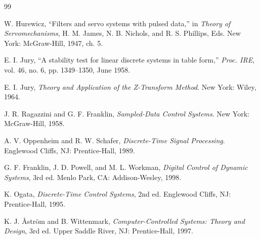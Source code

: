 
\begin{thebibliography}{99}

W. Hurewicz, ``Filters and servo systems with pulsed data,'' in \textit{Theory of Servomechanisms}, H. M. James, N. B. Nichols, and R. S. Phillips, Eds. New York: McGraw-Hill, 1947, ch. 5.

E. I. Jury, ``A stability test for linear discrete systems in table form,'' \textit{Proc. IRE}, vol. 46, no. 6, pp. 1349--1350, June 1958.

E. I. Jury, \textit{Theory and Application of the Z-Transform Method}. New York: Wiley, 1964.

J. R. Ragazzini and G. F. Franklin, \textit{Sampled-Data Control Systems}. New York: McGraw-Hill, 1958.

A. V. Oppenheim and R. W. Schafer, \textit{Discrete-Time Signal Processing}. Englewood Cliffs, NJ: Prentice-Hall, 1989.

G. F. Franklin, J. D. Powell, and M. L. Workman, \textit{Digital Control of Dynamic Systems}, 3rd ed. Menlo Park, CA: Addison-Wesley, 1998.

K. Ogata, \textit{Discrete-Time Control Systems}, 2nd ed. Englewood Cliffs, NJ: Prentice-Hall, 1995.

K. J. \r{A}str\"{o}m and B. Wittenmark, \textit{Computer-Controlled Systems: Theory and Design}, 3rd ed. Upper Saddle River, NJ: Prentice-Hall, 1997.

\end{thebibliography}

